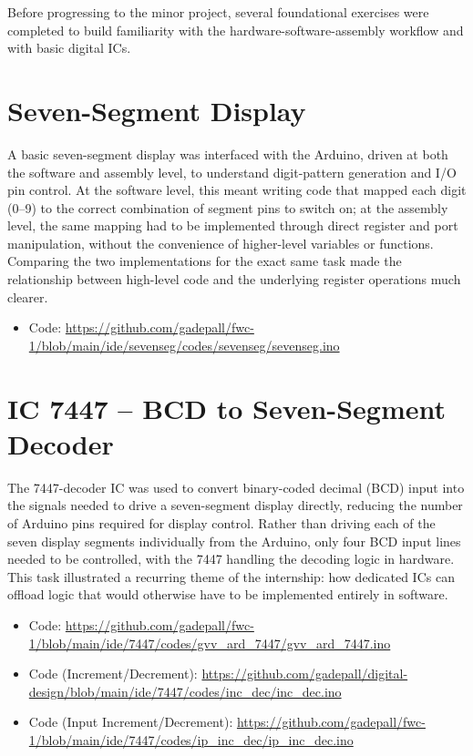 \documentclass[12pt,a4paper]{report}
\begin{document}
Before progressing to the minor project, several foundational exercises were completed to build familiarity with the hardware-software-assembly workflow and with basic digital ICs.

\section{Seven-Segment Display}
\label{sec:sevenseg}

A basic seven-segment display was interfaced with the Arduino, driven at both the software and assembly level, to understand digit-pattern generation and I/O pin control. At the software level, this meant writing code that mapped each digit (0--9) to the correct combination of segment pins to switch on; at the assembly level, the same mapping had to be implemented through direct register and port manipulation, without the convenience of higher-level variables or functions. Comparing the two implementations for the exact same task made the relationship between high-level code and the underlying register operations much clearer.

\begin{itemize}
    \item Code: \url{https://github.com/gadepall/fwc-1/blob/main/ide/sevenseg/codes/sevenseg/sevenseg.ino}
\end{itemize}

\section{IC 7447 -- BCD to Seven-Segment Decoder}
\label{sec:7447}

The 7447-decoder IC was used to convert binary-coded decimal (BCD) input into the signals needed to drive a seven-segment display directly, reducing the number of Arduino pins required for display control. Rather than driving each of the seven display segments individually from the Arduino, only four BCD input lines needed to be controlled, with the 7447 handling the decoding logic in hardware. This task illustrated a recurring theme of the internship: how dedicated ICs can offload logic that would otherwise have to be implemented entirely in software.

\begin{itemize}
    \item Code: \url{https://github.com/gadepall/fwc-1/blob/main/ide/7447/codes/gvv_ard_7447/gvv_ard_7447.ino}
    \item Code (Increment/Decrement): \url{https://github.com/gadepall/digital-design/blob/main/ide/7447/codes/inc_dec/inc_dec.ino}
    \item Code (Input Increment/Decrement): \url{https://github.com/gadepall/fwc-1/blob/main/ide/7447/codes/ip_inc_dec/ip_inc_dec.ino}
\end{itemize}
\end{document}
